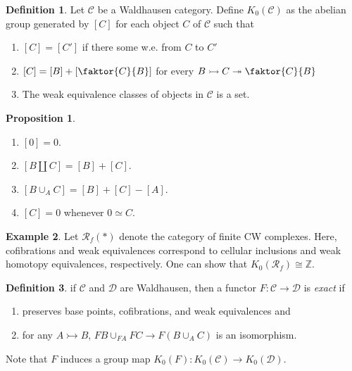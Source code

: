 \documentclass[10pt,letterpaper,cm]{nupset}
\theoremstyle{definition}
\newtheorem{definition}{Definition}
\newtheorem{exmp}[definition]{Example}
\theoremstyle{theorem}
\newtheorem{prop}[theorem]{Proposition}
\theoremstyle{remark}
\newcommand{\Z}{\mathbb Z}
\newcommand{\1}{\mathbf{1}}
\renewcommand{\c}{\mathscr{C}}
\renewcommand{\d}{\mathscr{D}}
\newcommand{\0}{\vec 0}
\begin{document}
\begin{definition}
Let $\c$ be a Waldhausen category. Define $K_0(\c)$ as the abelian group generated by $[C]$ for each object $C$ of $\c$ such that
\begin{enumerate}
\item $[C] = [C']$ if there some w.e. from $C$ to $C'$
\item $[C] = [B] + \left[\faktor{C}{B}\right]$ for every $B \rightarrowtail  C \twoheadrightarrow \faktor{C}{B}$
\item The weak equivalence classes of objects in $\c$ is a set.
\end{enumerate}
\end{definition}

\begin{prop} $ $
\begin{enumerate}
\item $[0] = 0$.
\item $\left[B \coprod C\right] = [B] +[C]$.
\item $\left[B \cup_A C\right] = [B]+[C]-[A]$.
\item $[C]= 0$ whenever $0 \simeq C$.
\end{enumerate}
\end{prop}

\begin{exmp}
Let $\mathcal{R}_f(\ast)$ denote the category of finite CW complexes. Here, cofibrations and weak equivalences correspond to cellular inclusions  and weak homotopy equivalences, respectively. One can show that $K_0(\mathcal{R}_f) \cong \Z$.
\end{exmp}

\begin{definition}
if $\c$ and $\d$ are Waldhausen, then a functor $F: \c \to \d$ is \textit{exact} if
\begin{enumerate}[label=(\alph*)] 
\item preserves base points, cofibrations, and weak equivalences and 
\item for any $A \rightarrowtail B$, $FB \cup_{FA} FC \to F(B\cup_A C)$ is an isomorphism. 
\end{enumerate}
\end{definition}

Note that $F$ induces a group map $K_0(F) :K_0(\c) \to K_0(\d)$.
\end{document}
